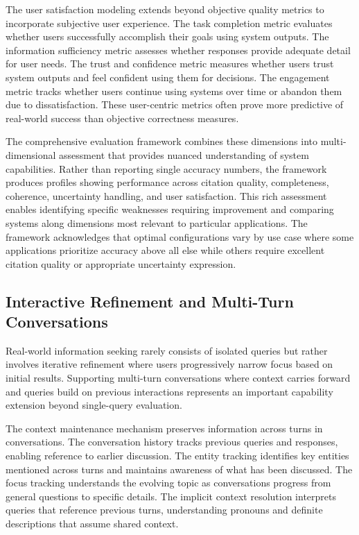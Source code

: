 The user satisfaction modeling extends beyond objective quality metrics to incorporate subjective user experience. The task completion metric evaluates whether users successfully accomplish their goals using system outputs. The information sufficiency metric assesses whether responses provide adequate detail for user needs. The trust and confidence metric measures whether users trust system outputs and feel confident using them for decisions. The engagement metric tracks whether users continue using systems over time or abandon them due to dissatisfaction. These user-centric metrics often prove more predictive of real-world success than objective correctness measures.

The comprehensive evaluation framework combines these dimensions into multi-dimensional assessment that provides nuanced understanding of system capabilities. Rather than reporting single accuracy numbers, the framework produces profiles showing performance across citation quality, completeness, coherence, uncertainty handling, and user satisfaction. This rich assessment enables identifying specific weaknesses requiring improvement and comparing systems along dimensions most relevant to particular applications. The framework acknowledges that optimal configurations vary by use case where some applications prioritize accuracy above all else while others require excellent citation quality or appropriate uncertainty expression.

\subsection{Interactive Refinement and Multi-Turn Conversations}

Real-world information seeking rarely consists of isolated queries but rather involves iterative refinement where users progressively narrow focus based on initial results. Supporting multi-turn conversations where context carries forward and queries build on previous interactions represents an important capability extension beyond single-query evaluation.

The context maintenance mechanism preserves information across turns in conversations. The conversation history tracks previous queries and responses, enabling reference to earlier discussion. The entity tracking identifies key entities mentioned across turns and maintains awareness of what has been discussed. The focus tracking understands the evolving topic as conversations progress from general questions to specific details. The implicit context resolution interprets queries that reference previous turns, understanding pronouns and definite descriptions that assume shared context.

